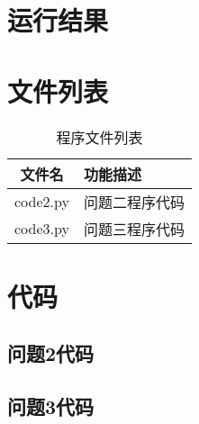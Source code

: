 \documentclass[withoutpreface,bwprint]{cumcmthesis} %
\begin{document}
\newpage
\begin{appendices}

\section{运行结果}


\section{文件列表}
\begin{table}[H]
    \caption{程序文件列表}
    \centering
    \begin{tabularx}{0.85\textwidth}{c l}
        \bottomrule[1.5pt]
        文件名 & 功能描述 \\
        \midrule[1pt]
        code2.py & 问题二程序代码 \\
        code3.py & 问题三程序代码 \\
        \bottomrule[1.5pt]
    \end{tabularx}
    \label{tab:文件列表}
\end{table}

\section{代码}

\subsection{问题2代码}


\subsection{问题3代码}


\end{appendices}
\end{document}
